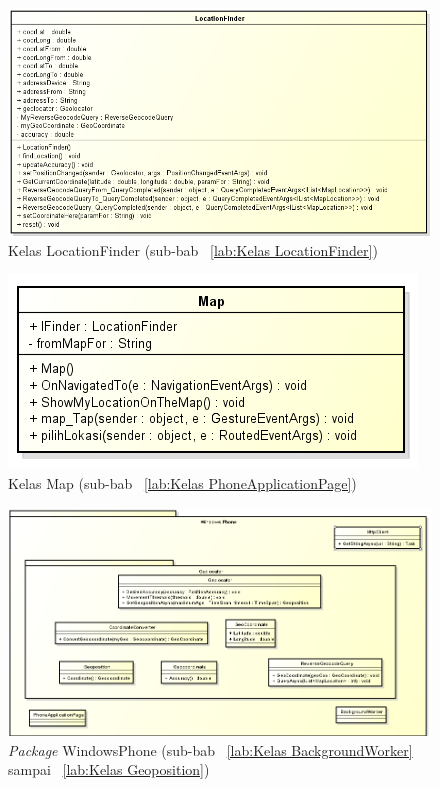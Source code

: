 \begin{figure}[h!]
	\centering
		\includegraphics[scale=0.7]{Gambar/useCase_dan_Class/perClass/locationFinder}
	\caption{Kelas LocationFinder (sub-bab ~\ref{lab:Kelas LocationFinder})}
	\label{fig:kelaslLocationFinder}
\end{figure}

\begin{figure}[h!]
	\centering
		\includegraphics[scale=0.7]{Gambar/useCase_dan_Class/perClass/map}
	\caption{Kelas Map (sub-bab ~\ref{lab:Kelas PhoneApplicationPage})}
	\label{fig:kelaslMap}
\end{figure}

\begin{figure}[h!]
	\centering
		\includegraphics[scale=0.6]{Gambar/useCase_dan_Class/perClass/packageWindowsPhone}
	\caption{\textit{Package} WindowsPhone (sub-bab ~\ref{lab:Kelas BackgroundWorker} sampai ~\ref{lab:Kelas Geoposition})}
	\label{fig:kelaslPackageWindowsPhone}
\end{figure}

